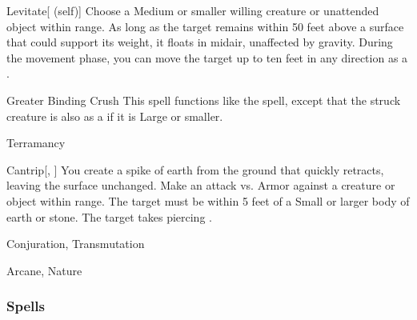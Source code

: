 \lowercase{\hypertarget{spell:Levitate}{}}\label{spell:Levitate}
\begin{ability}[\nth{4}]{\hypertarget{spell:Levitate}{Levitate}}[ (self)]
Choose a Medium or smaller willing creature or unattended object within \rngclose range.
As long as the target remains within 50 feet above a surface that could support its weight, it floats in midair, unaffected by gravity.
During the movement phase, you can move the target up to ten feet in any direction as a .
\end{ability}
\vspace{0.25em}



\lowercase{\hypertarget{spell:Greater Binding Crush}{}}\label{spell:Greater Binding Crush}
\begin{ability}[\nth{5}]{\hypertarget{spell:Greater Binding Crush}{Greater Binding Crush}}
This spell functions like the  spell, except that the struck creature is also  as a  if it is Large or smaller.
\end{ability}
\vspace{0.25em}


\newpage
\begin{spellsection}{Terramancy}

\begin{spellheader}
\end{spellheader}


\begin{ability}{Cantrip}[, ]
You create a spike of earth from the ground that quickly retracts, leaving the surface unchanged.
Make an attack vs. Armor against a creature or object within \rngclose range.
The target must be within 5 feet of a Small or larger body of earth or stone.
\hit The target takes piercing .
\end{ability}




 Conjuration, Transmutation

 Arcane, Nature
\end{spellsection}


\subsubsection{Spells}


